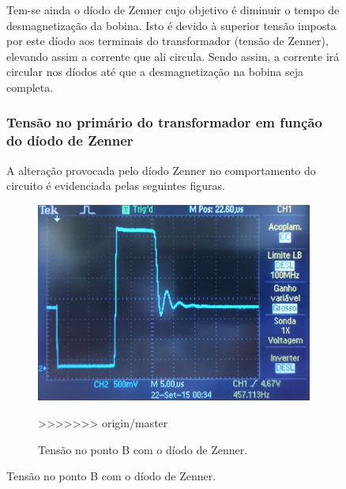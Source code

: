 \documentclass[a4paper,11pt]{article}
\numberwithin{equation}{section}
\begin{document}
\begin{figure}[h]
Tem-se ainda o díodo de Zenner cujo objetivo é diminuir o tempo de desmagnetização da bobina. Isto é devido à superior tensão imposta por este díodo aos terminais do transformador (tensão de Zenner), elevando assim a corrente que ali circula. Sendo assim, a corrente irá circular nos díodos até que a desmagnetização na bobina seja completa. 

\subsubsection{Tensão no primário do transformador em função do díodo de Zenner}

A alteração provocada pelo díodo Zenner no comportamento do circuito é evidenciada pelas seguintes figuras.

\begin{figure}[h]
	\centering
	\includegraphics[keepaspectratio=true, scale=0.14]{img/DSC0118}
	\caption{Tensão no ponto B com o díodo de Zenner.}
	\label{fig:photo 2}
>>>>>>> origin/master
	\vspace{-0.8em}
\end{figure}


\end{figure}
\end{document}
